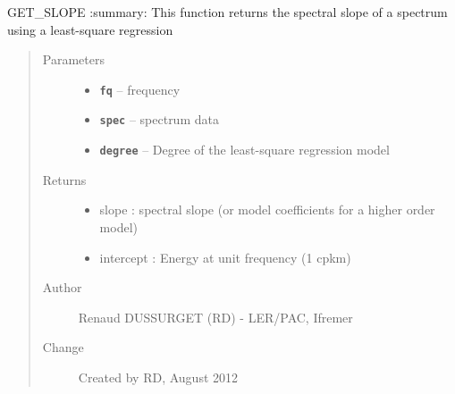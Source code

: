 \documentclass[letterpaper,10pt,english]{sphinxmanual}
\begin{document}
\begin{fulllineitems}
\label{altimetry.tools.spectrum:altimetry.tools.spectrum.get_slope}
GET\_SLOPE
:summary: This function returns the spectral slope of a spectrum using a least-square regression
\begin{quote}\begin{description}
\item[{Parameters}] \leavevmode\begin{itemize}
\item {} 
\textbf{\texttt{fq}} -- frequency

\item {} 
\textbf{\texttt{spec}} -- spectrum data

\item {} 
\textbf{\texttt{degree}} -- Degree of the least-square regression model

\end{itemize}

\item[{Returns}] \leavevmode
\begin{itemize}
\item {} 
slope : spectral slope (or model coefficients for a higher order model)

\item {} 
intercept : Energy at unit frequency (1 cpkm)

\end{itemize}


\item[{Author}] \leavevmode
Renaud DUSSURGET (RD) - LER/PAC, Ifremer

\item[{Change}] \leavevmode
Created by RD, August 2012

\end{description}\end{quote}

\end{fulllineitems}

\end{document}
